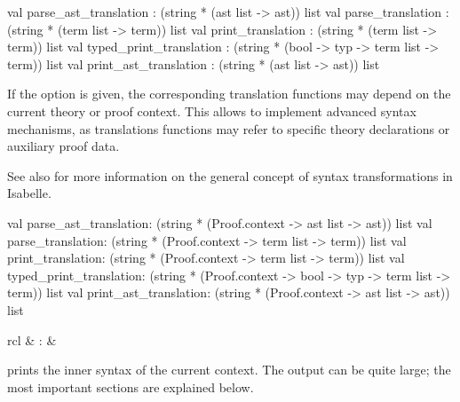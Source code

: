 \begin{isabellebody}
\begin{isamarkuptext}
\begin{ttbox}
val parse_ast_translation   : (string * (ast list -> ast)) list
val parse_translation       : (string * (term list -> term)) list
val print_translation       : (string * (term list -> term)) list
val typed_print_translation :
  (string * (bool -> typ -> term list -> term)) list
val print_ast_translation   : (string * (ast list -> ast)) list
\end{ttbox}

  If the  option is given, the corresponding
  translation functions may depend on the current theory or proof
  context.  This allows to implement advanced syntax mechanisms, as
  translations functions may refer to specific theory declarations or
  auxiliary proof data.

  See also \cite{isabelle-ref} for more information on the general
  concept of syntax transformations in Isabelle.

\begin{ttbox}
val parse_ast_translation:
  (string * (Proof.context -> ast list -> ast)) list
val parse_translation:
  (string * (Proof.context -> term list -> term)) list
val print_translation:
  (string * (Proof.context -> term list -> term)) list
val typed_print_translation:
  (string * (Proof.context -> bool -> typ -> term list -> term)) list
val print_ast_translation:
  (string * (Proof.context -> ast list -> ast)) list
\end{ttbox}%
\end{isamarkuptext}%
\isamarkuptrue%
%
\isamarkuptrue%
%
\begin{isamarkuptext}%
\begin{matharray}{rcl}
    \hypertarget{command.print-syntax}{\hyperlink{command.print-syntax}{\mbox{}}}\isa{{\isachardoublequote}\isactrlsup {\isacharasterisk}{\isachardoublequote}} & : &  \\
  \end{matharray}

  \begin{description}

  \item \hyperlink{command.print-syntax}{\mbox{}} prints the inner syntax of the
  current context.  The output can be quite large; the most important
  sections are explained below.


\end{description}
\end{isamarkuptext}
\end{isabellebody}
